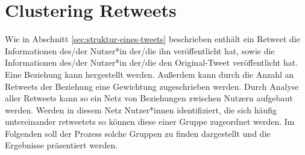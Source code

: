 \chapter{Clustering Retweets}
\label{chap:cluster_retweets}
Wie in Abschnitt \ref{sec:struktur-eines-tweets} beschrieben enthält ein \gls{Retweet} die Informationen des/der Nutzer*in der/die ihn veröffentlicht hat, sowie die Informationen des/der Nutzer*in der/die den Original-Tweet veröffentlicht hat. Eine Beziehung kann hergestellt werden. Außerdem kann durch die Anzahl an \glspl{Retweet} der Beziehung eine Gewichtung zugeschrieben werden. Durch Analyse aller \glspl{Retweet} kann so ein Netz von Beziehungen zwischen Nutzern aufgebaut werden.
Werden in diesem Netz Nutzer*innen identifiziert, die sich häufig untereinander \glspl{retweetet} so können diese einer Gruppe zugeordnet werden. Im Folgenden soll der Prozess solche Gruppen zu finden dargestellt und die Ergebnisse präsentiert werden.

